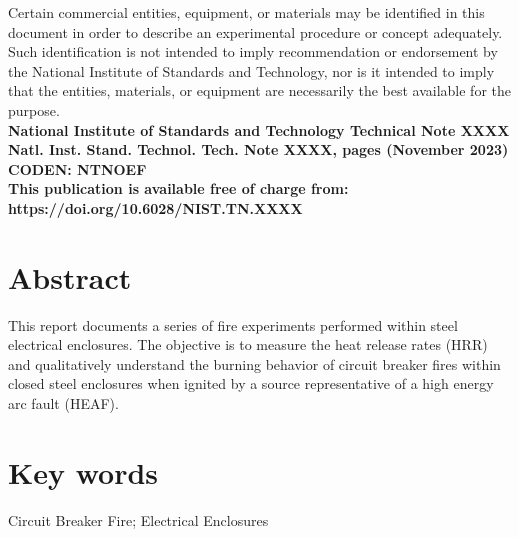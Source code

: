 \documentclass[12pt]{article}
\newcommand{\pubnumber}{XXXX}
\newcommand{\DOI}{https://doi.org/10.6028/NIST.TN.XXXX}
\newcommand{\monthyear}{November 2023}
\begin{document}
\begin{titlepage}
\begin{flushright}
\footnotesize  Certain commercial entities, equipment, or materials may be identified in this document in order to describe an experimental procedure or concept adequately. Such identification is not intended to imply recommendation or endorsement by the National Institute of Standards and Technology, nor is it intended to imply that the entities, materials, or equipment are necessarily the best available for the purpose.\\
\vfill
\normalsize \textbf{National Institute of Standards and Technology Technical Note \pubnumber\\
Natl. Inst. Stand. Technol. Tech. Note \pubnumber, \pageref{LastPage} pages (\monthyear)} \\
\textbf{CODEN: NTNOEF}\\
\vspace{12pt}
\textbf{This publication is available free of charge from: \DOI}
\vfill
\end{flushright}
\end{titlepage}


\section*{Abstract}

\normalsize This report documents a series of fire experiments performed within steel electrical enclosures. The objective is to measure the heat release rates (HRR) and qualitatively understand the burning behavior of circuit breaker fires within closed steel enclosures when ignited by a source representative of a high energy arc fault (HEAF).  \\

\section*{Key words}
\normalsize Circuit Breaker Fire; Electrical Enclosures\\
\pagebreak
\begin{center}
	\tableofcontents
	\listoftables
	\listoffigures
\end{center}
\end{document}
